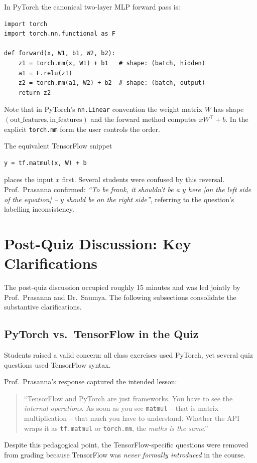 \documentclass[12pt,a4paper]{article}
\begin{document}
\begin{example}
In PyTorch the canonical two-layer MLP forward pass is:
\begin{verbatim}
import torch
import torch.nn.functional as F

def forward(x, W1, b1, W2, b2):
    z1 = torch.mm(x, W1) + b1   # shape: (batch, hidden)
    a1 = F.relu(z1)
    z2 = torch.mm(a1, W2) + b2  # shape: (batch, output)
    return z2
\end{verbatim}
Note that in PyTorch's \texttt{nn.Linear} convention the weight matrix
$W$ has shape $(\text{out\_features}, \text{in\_features})$ and the
forward method computes $x W^{\top} + b$.  In the explicit
\texttt{torch.mm} form the user controls the order.
\end{example}

The equivalent TensorFlow snippet
\begin{verbatim}
y = tf.matmul(x, W) + b
\end{verbatim}
places the input $x$ first.  Several students were confused by this
reversal.  Prof.\ Prasanna confirmed: \textit{``To be frank, it
shouldn't be a $y$ here [on the left side of the equation] -- $y$
should be on the right side''}, referring to the question's labelling
inconsistency.

\section{Post-Quiz Discussion: Key Clarifications}
\label{sec:post_quiz_review}

The post-quiz discussion occupied roughly 15 minutes and was led jointly
by Prof.\ Prasanna and Dr.\ Saumya.  The following subsections
consolidate the substantive clarifications.

\subsection{PyTorch vs.\ TensorFlow in the Quiz}
\label{ssec:tf_vs_pt}

Students raised a valid concern: all class exercises used PyTorch, yet
several quiz questions used TensorFlow syntax.

\begin{keyinsight}
Prof.\ Prasanna's response captured the intended lesson:
\begin{quote}
  ``TensorFlow and PyTorch are just frameworks.  You have to see the
  \emph{internal operations}.  As soon as you see \texttt{matmul} -- that is
  matrix multiplication -- that much you have to understand.  Whether the
  API wraps it as \texttt{tf.matmul} or \texttt{torch.mm}, the
  \emph{maths is the same}.''
\end{quote}
\noindent
Despite this pedagogical point, the TensorFlow-specific questions were
removed from grading because TensorFlow was \emph{never formally introduced}
in the course.
\end{keyinsight}
\end{document}
